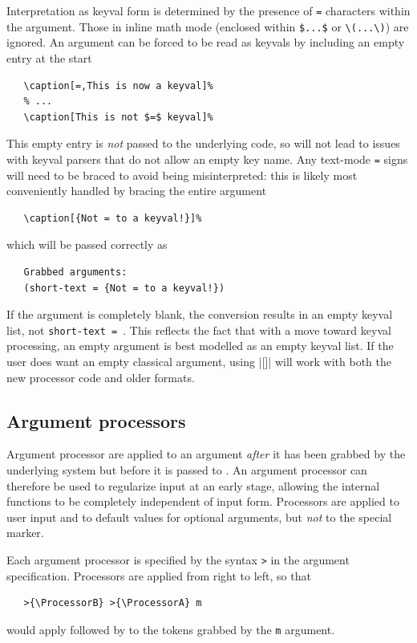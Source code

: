\documentclass{ltxguide}
\begin{document}
Interpretation as keyval form is determined by the presence of \texttt{=}
characters within the argument. Those in inline math mode (enclosed within
\verb|$...$| or \verb|\(...\)|) are ignored. An argument can be forced to be
read as keyvals by including an empty entry at the start
\begin{verbatim}
   \caption[=,This is now a keyval]%
   % ...
   \caption[This is not $=$ keyval]%
\end{verbatim}

This empty entry is \emph{not} passed to the underlying code, so will not lead
to issues with keyval parsers that do not allow an empty key name. Any text-mode
\texttt{=} signs will need to be braced to avoid being misinterpreted: this
is likely most conveniently handled by bracing the entire argument
\begin{verbatim}
   \caption[{Not = to a keyval!}]%
\end{verbatim}
which will be passed correctly as
\begin{verbatim}
   Grabbed arguments:
   (short-text = {Not = to a keyval!})
\end{verbatim}

If the argument is completely blank, the conversion results in an empty keyval
list, not \verb*|short-text = |. This reflects the fact that with a move toward
keyval processing, an empty argument is best modelled as an empty keyval list.
If the user does want an empty classical argument, using |[{}]| will work
with both the new processor code and older formats.

\subsection{Argument processors}
\label{sec:cmd:processors}

Argument processor are applied to an argument \emph{after} it has been grabbed
by the underlying system but before it is passed to . An argument
processor can therefore be used to regularize input at an early stage, allowing
the internal functions to be completely independent of input form. Processors
are applied to user input and to default values for optional arguments, but
\emph{not} to the special  marker.

Each argument processor is specified by the syntax \texttt{>}
in the argument specification. Processors are applied from right to left, so
that
\begin{verbatim}
   >{\ProcessorB} >{\ProcessorA} m
\end{verbatim}
would apply  followed by  to the tokens grabbed
by the \texttt{m} argument.
\end{document}
